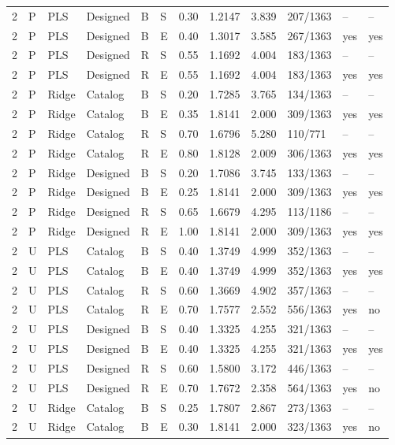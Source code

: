 \documentclass[10pt,a4paper]{article}
\begin{document}
\begin{landscape}
\begin{longtable}{rlllllrrrlll}
2 & P & PLS & Designed & B & S & 0.30 & 1.2147 & 3.839 & 207/1363 & -- & -- \\
2 & P & PLS & Designed & B & E & 0.40 & 1.3017 & 3.585 & 267/1363 & yes & yes \\
2 & P & PLS & Designed & R & S & 0.55 & 1.1692 & 4.004 & 183/1363 & -- & -- \\
2 & P & PLS & Designed & R & E & 0.55 & 1.1692 & 4.004 & 183/1363 & yes & yes \\
2 & P & Ridge & Catalog & B & S & 0.20 & 1.7285 & 3.765 & 134/1363 & -- & -- \\
2 & P & Ridge & Catalog & B & E & 0.35 & 1.8141 & 2.000 & 309/1363 & yes & yes \\
2 & P & Ridge & Catalog & R & S & 0.70 & 1.6796 & 5.280 & 110/771 & -- & -- \\
2 & P & Ridge & Catalog & R & E & 0.80 & 1.8128 & 2.009 & 306/1363 & yes & yes \\
2 & P & Ridge & Designed & B & S & 0.20 & 1.7086 & 3.745 & 133/1363 & -- & -- \\
2 & P & Ridge & Designed & B & E & 0.25 & 1.8141 & 2.000 & 309/1363 & yes & yes \\
2 & P & Ridge & Designed & R & S & 0.65 & 1.6679 & 4.295 & 113/1186 & -- & -- \\
2 & P & Ridge & Designed & R & E & 1.00 & 1.8141 & 2.000 & 309/1363 & yes & yes \\
2 & U & PLS & Catalog & B & S & 0.40 & 1.3749 & 4.999 & 352/1363 & -- & -- \\
2 & U & PLS & Catalog & B & E & 0.40 & 1.3749 & 4.999 & 352/1363 & yes & yes \\
2 & U & PLS & Catalog & R & S & 0.60 & 1.3669 & 4.902 & 357/1363 & -- & -- \\
2 & U & PLS & Catalog & R & E & 0.70 & 1.7577 & 2.552 & 556/1363 & yes & no \\
2 & U & PLS & Designed & B & S & 0.40 & 1.3325 & 4.255 & 321/1363 & -- & -- \\
2 & U & PLS & Designed & B & E & 0.40 & 1.3325 & 4.255 & 321/1363 & yes & yes \\
2 & U & PLS & Designed & R & S & 0.60 & 1.5800 & 3.172 & 446/1363 & -- & -- \\
2 & U & PLS & Designed & R & E & 0.70 & 1.7672 & 2.358 & 564/1363 & yes & no \\
2 & U & Ridge & Catalog & B & S & 0.25 & 1.7807 & 2.867 & 273/1363 & -- & -- \\
2 & U & Ridge & Catalog & B & E & 0.30 & 1.8141 & 2.000 & 323/1363 & yes & no \\

\end{longtable}
\end{landscape}
\end{document}
